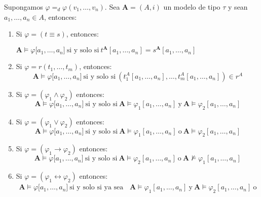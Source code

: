   \begin{lemma} \label{lemma_62}
    \PN Supongamos $\varphi =_{d} \varphi(v_{1}, \dotsc, v_{n})$. Sea $\mathbf{A} = (A, i)$ un modelo de tipo $\tau$ y
    sean $a_{1}, \dotsc, a_{n} \in A$, entonces:
    \begin{enumerate}
      \item Si $\varphi = (t \equiv s)$, entonces:
      \begin{center}
        $\mathbf{A} \models \varphi \lbrack a_{1}, \dotsc, a_{n}] \ \text{si y solo si} \ t^{\mathbf{A}}[a_{1}, \dotsc,
        a_{n}]=s^{\mathbf{A}}[a_{1}, \dotsc, a_{n}]$
      \end{center}
      \item Si $\varphi = r(t_{1}, \dotsc, t_{m})$, entonces:
      \begin{equation*}
        \mathbf{A} \models \varphi \lbrack a_{1}, \dotsc, a_{n}] \ \text{si y solo si} \ (t_{1}^{A}[a_{1}, \dotsc,
        a_{n}], \dotsc, t_{m}^{A}[a_{1}, \dotsc, a_{n}])\in r^{A}
      \end{equation*}
      \item Si $\varphi = (\varphi_{1} \wedge \varphi_{2})$ entonces:
      \[
        \mathbf{A} \models \varphi \lbrack a_{1}, \dotsc, a_{n}] \ \text{si y solo si} \ \mathbf{A} \models \varphi_{1}
        [a_{1}, \dotsc, a_{n}] \ \text{y} \ \mathbf{A} \models \varphi_{2}[a_{1}, \dotsc, a_{n}]
      \]
      \item Si $\varphi = (\varphi_{1} \vee \varphi_{2})$ entonces:
      \[
        \mathbf{A} \models \varphi \lbrack a_{1}, \dotsc, a_{n}] \ \text{si y solo si} \ \mathbf{A} \models \varphi_{1}
        [a_{1}, \dotsc, a_{n}] \ \text{o} \ \mathbf{A} \models \varphi_{2}[a_{1}, \dotsc, a_{n}]
      \]
      \item Si $\varphi = (\varphi_{1} \rightarrow \varphi_{2})$ entonces:
      \[
        \mathbf{A} \models \varphi \lbrack a_{1}, \dotsc, a_{n}] \ \text{si y solo si} \ \mathbf{A} \models \varphi_{2}
        [a_{1}, \dotsc, a_{n}] \ \text{o} \ \mathbf{A} \not\models \varphi_{1}[a_{1}, \dotsc, a_{n}]
      \]
      \item Si $\varphi = (\varphi_{1} \leftrightarrow \varphi_{2})$ entonces:
      \begin{eqnarray*}
        \mathbf{A} \models \varphi \lbrack a_{1}, \dotsc, a_{n}] \ \text{si y solo si ya sea} \ && \mathbf{A} \models
        \varphi_{1}[a_{1}, \dotsc, a_{n}] \ \text{y} \ \mathbf{A} \models \varphi_{2}[a_{1}, \dotsc, a_{n}] \ \text{o}
        \\

\end{eqnarray*}
\end{enumerate}
\end{lemma}

